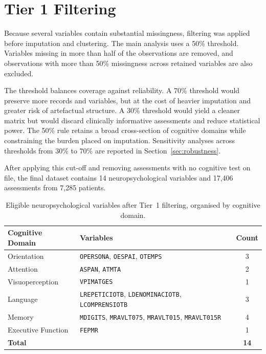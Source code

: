 
\section{Tier 1 Filtering}\label{sec:filtering}

Because several variables contain substantial missingness, filtering was applied before imputation and clustering. The main analysis uses a 50\% threshold. Variables missing in more than half of the observations are removed, and observations with more than 50\% missingness across retained variables are also excluded.

The threshold balances coverage against reliability. A 70\% threshold would preserve more records and variables, but at the cost of heavier imputation and greater risk of artefactual structure. A 30\% threshold would yield a cleaner matrix but would discard clinically informative assessments and reduce statistical power. The 50\% rule retains a broad cross-section of cognitive domains while constraining the burden placed on imputation. Sensitivity analyses across thresholds from 30\% to 70\% are reported in Section~\ref{sec:robustness}.

After applying this cut-off and removing assessments with no cognitive test on file, the final dataset contains 14 neuropsychological variables and 17,406 assessments from 7,285 patients.

\begin{table}[ht]
\caption{Eligible neuropsychological variables after Tier~1 filtering, organised by cognitive domain.}
\label{tab:eligible_vars}
\centering
\small
\begin{tabular}{l p{} c}
\toprule
\textbf{Cognitive Domain} & \textbf{Variables} & \textbf{Count} \\
\midrule
Orientation        & \texttt{OPERSONA}, \texttt{OESPAI}, \texttt{OTEMPS} & 3 \\
Attention          & \texttt{ASPAN}, \texttt{ATMTA} & 2 \\
Visuoperception    & \texttt{VPIMATGES} & 1 \\
Language           & \texttt{LREPETICIOTB}, \texttt{LDENOMINACIOTB}, \texttt{LCOMPRENSIOTB} & 3 \\
Memory             & \texttt{MDIGITS}, \texttt{MRAVLT075}, \texttt{MRAVLT015}, \texttt{MRAVLT015R} & 4 \\
Executive Function & \texttt{FEPMR} & 1 \\
\midrule
\textbf{Total}     & & \textbf{14} \\
\bottomrule
\end{tabular}
\end{table}

